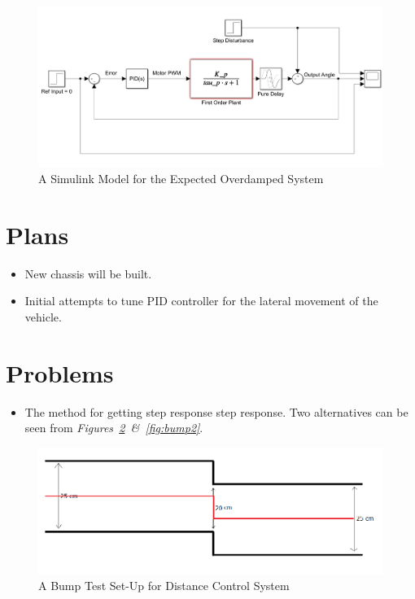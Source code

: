 \documentclass[a4paper,12pt]{article}
\begin{document}
\begin{itemize}
	
	
	
	
		\begin{figure}[H]
			\center
			\setlength{\unitlength}{\textwidth} 
			\includegraphics[width=1\unitlength]{cont}
			\caption{\label{fig:cont} A Simulink Model for the Expected Overdamped System}
		\end{figure}
	
	\end{itemize}
\section{Plans}
\begin{itemize}
\item New chassis will be built.
\item Initial attempts to tune PID controller for the lateral movement of the vehicle.  
\end{itemize}

\section{Problems}
\begin{itemize}
	\item The method for getting step response step response. Two alternatives can be seen from \textit{Figures~\ref{fig:bump1}~\&~\ref{fig:bump2}}.
\end{itemize}


		\begin{figure}[H]
			\center
			\setlength{\unitlength}{\textwidth} 
			\includegraphics[width=1\unitlength]{bump_test_dist}
			\caption{\label{fig:bump1} A Bump Test Set-Up for Distance Control System }
		\end{figure}
		
\end{document}

